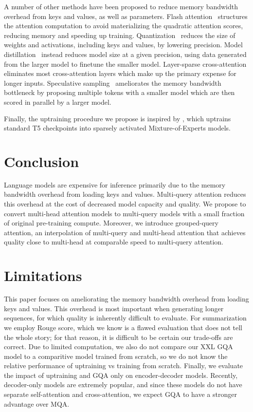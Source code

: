 \documentclass[11pt]{article}
\newcommand{\mq}{\textsc{MQA}\xspace}
\newcommand{\gmq}{\textsc{GQA}\xspace}
\begin{document}
A number of other methods have been proposed to reduce memory bandwidth overhead from keys and values, as well as parameters. Flash attention~\citep{flashattention} structures the attention computation to avoid materializing the quadratic attention scores, reducing memory and speeding up training. Quantization~\citep{int8, gptq} reduces the size of weights and activations, including keys and values, by lowering precision. Model distillation~\citep{distill, distillsurvey} instead reduces model size at a given precision, using data generated from the larger model to finetune the smaller model. Layer-sparse cross-attention \citep{dejong2022fido} eliminates most cross-attention layers which make up the primary expense for longer inputs. Speculative sampling~\citep{specchen, specleviathan} ameliorates the memory bandwidth bottleneck by proposing multiple tokens with a smaller model which are then scored in parallel by a larger model. 

Finally, the uptraining procedure we propose is inspired by \citet{sparsemoe}, which uptrains standard T5 checkpoints into sparsely activated Mixture-of-Experts models.

\label{section:related}

\section{Conclusion}
\label{section:conclusion}

Language models are expensive for inference primarily due to the memory bandwidth overhead from loading keys and values. Multi-query attention reduces this overhead at the cost of decreased model capacity and quality. We propose to convert multi-head attention models to multi-query models with a small fraction of original pre-training compute. Moreover, we introduce grouped-query attention, an interpolation of multi-query and multi-head attention that achieves quality close to multi-head at comparable speed to multi-query attention. 

\section*{Limitations}

This paper focuses on ameliorating the memory bandwidth overhead from loading keys and values. This overhead is most important when generating longer sequences, for which quality is inherently difficult to evaluate. For summarization we employ Rouge score, which we know is a flawed evaluation that does not tell the whole story; for that reason, it is difficult to be certain our trade-offs are correct. Due to limited computation, we also do not compare our XXL \gmq model to a comparitive model trained from scratch, so we do not know the relative performance of uptraining vs training from scratch. Finally, we evaluate the impact of uptraining and \gmq only on encoder-decoder models. Recently, decoder-only models are extremely popular, and since these models do not have separate self-attention and cross-attention, we expect \gmq to have a stronger advantage over \mq.
\end{document}
